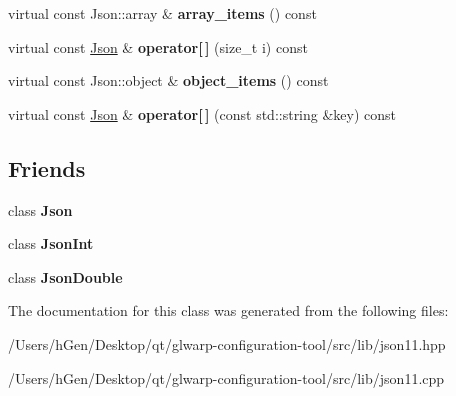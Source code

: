 \begin{DoxyCompactItemize}
virtual const Json\+::array \& {\bfseries array\+\_\+items} () const
\item 
\mbox{\label{classjson11_1_1_json_value_a8e87087afb53fceb8350f7bc1e28c18f}} 
virtual const \mbox{\hyperlink{classjson11_1_1_json}{Json}} \& {\bfseries operator\mbox{[}$\,$\mbox{]}} (size\+\_\+t i) const
\item 
\mbox{\label{classjson11_1_1_json_value_a42b4e842ac0697004e7ba76646a6f9be}} 
virtual const Json\+::object \& {\bfseries object\+\_\+items} () const
\item 
\mbox{\label{classjson11_1_1_json_value_abb082ed22afec495df30552bb4c67248}} 
virtual const \mbox{\hyperlink{classjson11_1_1_json}{Json}} \& {\bfseries operator\mbox{[}$\,$\mbox{]}} (const std\+::string \&key) const
\end{DoxyCompactItemize}
\subsection*{Friends}
\begin{DoxyCompactItemize}
\item 
\mbox{\label{classjson11_1_1_json_value_a7dd8a79e9210a2a230d000eee63c6e8a}} 
class {\bfseries Json}
\item 
\mbox{\label{classjson11_1_1_json_value_a4079b619596181593da9d6fde75ee2f3}} 
class {\bfseries Json\+Int}
\item 
\mbox{\label{classjson11_1_1_json_value_a0bdd38d55ffef87604233cb81a887f47}} 
class {\bfseries Json\+Double}
\end{DoxyCompactItemize}


The documentation for this class was generated from the following files\+:\begin{DoxyCompactItemize}
\item 
/\+Users/h\+Gen/\+Desktop/qt/glwarp-\/configuration-\/tool/src/lib/json11.\+hpp\item 
/\+Users/h\+Gen/\+Desktop/qt/glwarp-\/configuration-\/tool/src/lib/json11.\+cpp\end{DoxyCompactItemize}
